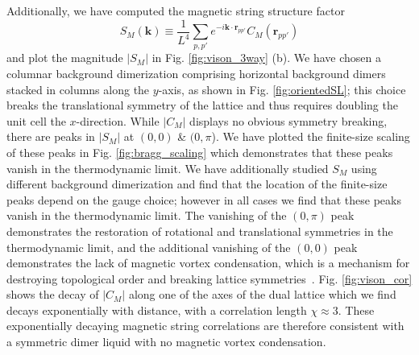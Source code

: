 \documentclass[twocolumn,prb,aps,floatfix,superscriptaddress]{revtex4-1}
\newcommand{\figref}[1]{Fig. \ref{#1}}
\begin{document}
Additionally, we have computed the magnetic string structure factor
\begin{equation}
S_M\left( \bm{k} \right) \equiv \frac{1}{ L^4} \sum_{p,p'} e^{-i \bm{k} \cdot \bm{r}_{pp'}} C_M\left( \bm{r}_{pp'}\right)
\end{equation}
and plot the magnitude $|S_M|$ in \figref{fig:vison_3way} (b). We have chosen a columnar background dimerization comprising horizontal background dimers stacked in columns along the $y$-axis, as shown in \figref{fig:orientedSL}; this choice breaks the translational symmetry of the lattice and thus requires doubling the unit cell the $x$-direction. While $|C_M|$ displays no obvious symmetry breaking, there are peaks in $|S_M|$ at $(0,0)$ \& $(0,\pi$). We have plotted the finite-size scaling of these peaks in \figref{fig:bragg_scaling} which demonstrates that these peaks vanish in the thermodynamic limit. We have additionally studied $S_M$ using different background dimerization and find that the location of the finite-size peaks depend on the gauge choice; however in all cases we find that these peaks vanish in the thermodynamic limit. The vanishing of the $(0,\pi)$ peak demonstrates the restoration of rotational and translational symmetries in the thermodynamic limit, and the additional vanishing of the $(0,0)$ peak demonstrates the lack of magnetic vortex condensation, which is a mechanism for destroying topological order and breaking lattice symmetries~\cite{Jalabert1991,Ralko2007,Huh2011}. \figref{fig:vison_cor} shows the decay of $|C_M|$ along one of the axes of the dual lattice which we find decays exponentially with distance, with a correlation length $\chi\approx 3$. These exponentially decaying magnetic string correlations are therefore consistent with a symmetric dimer liquid with no magnetic vortex condensation.
\end{document}

